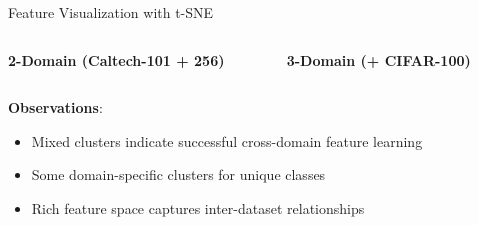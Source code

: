 \documentclass[aspectratio=169]{beamer}
\begin{document}
\begin{frame}{Feature Visualization with t-SNE}
    \begin{columns}[T]
        \begin{column}{0.48\textwidth}
            \textbf{2-Domain (Caltech-101 + 256)}
            \begin{center}
                \resizebox{\textwidth}{!}{}
            \end{center}
        \end{column}

        \begin{column}{0.48\textwidth}
            \textbf{3-Domain (+ CIFAR-100)}
            \begin{center}
                \resizebox{\textwidth}{!}{}
            \end{center}
        \end{column}
    \end{columns}

    \vspace{1em}

    \textbf{Observations}:
    \begin{itemize}
        \item Mixed clusters indicate successful cross-domain feature learning
        \item Some domain-specific clusters for unique classes
        \item Rich feature space captures inter-dataset relationships
    \end{itemize}
\end{frame}
\end{document}
